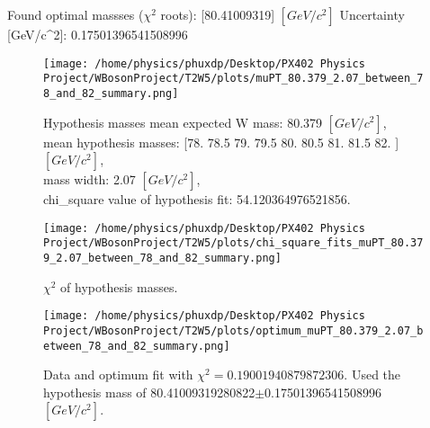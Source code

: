 \documentclass[12pt]{article}
\begin{document}
    Found optimal massses ($\chi^2$ roots): [80.41009319] $[GeV/c^{2}]$
    Uncertainty [GeV/c^2]: 0.17501396541508996

	\begin{figure}[tb]
		\centering
		\texttt{[image: /home/physics/phuxdp/Desktop/PX402 Physics Project/WBosonProject/T2W5/plots/muPT\_80.379\_2.07\_between\_78\_and\_82\_summary.png]}
		\caption{\small Hypothesis masses mean expected W mass: 80.379 $[GeV/c^{2}]$,\\
mean hypothesis masses: [78.  78.5 79.  79.5 80.  80.5 81.  81.5 82. ] $[GeV/c^{2}]$,\\
mass width: 2.07 $[GeV/c^{2}]$,\\
chi_square value of hypothesis fit: 54.120364976521856. }
		\label{fig: fig_0}
	\end{figure}

       \begin{figure}[tb]
		\centering
		\texttt{[image: /home/physics/phuxdp/Desktop/PX402 Physics Project/WBosonProject/T2W5/plots/chi\_square\_fits\_muPT\_80.379\_2.07\_between\_78\_and\_82\_summary.png]}
		\caption{\small $\chi^2$ of hypothesis masses. }
		\label{fig: fig_chi_square}
	\end{figure}

    \begin{figure}[tb]
		\centering
		\texttt{[image: /home/physics/phuxdp/Desktop/PX402 Physics Project/WBosonProject/T2W5/plots/optimum\_muPT\_80.379\_2.07\_between\_78\_and\_82\_summary.png]}
		\caption{\small Data and optimum fit with $\chi^2 = 0.19001940879872306$. Used the hypothesis mass of 80.41009319280822$\pm$0.17501396541508996 $[GeV/c^{2}]$. }
		\label{fig: fig_optim_parms}
	\end{figure}
    
\end{document}
